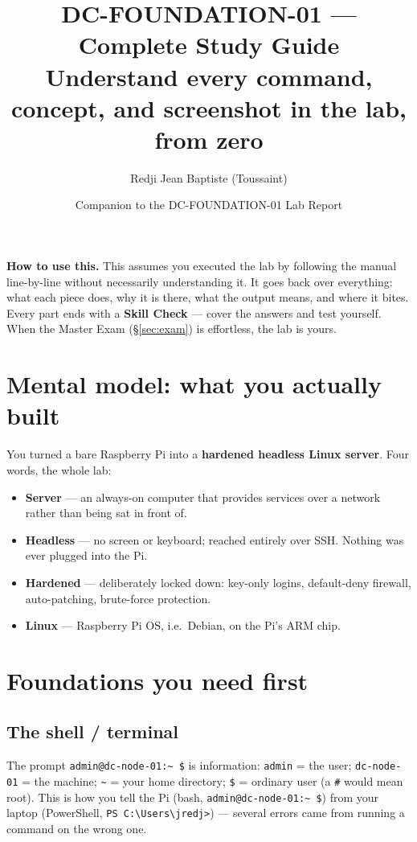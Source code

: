 \documentclass[11pt,a4paper]{article}
\title{\vspace{-1cm}\textbf{\color{dcred}DC-FOUNDATION-01 — Complete Study Guide}\\[4pt]
\large Understand every command, concept, and screenshot in the lab, from zero}
\author{Redji Jean Baptiste (Toussaint)}
\date{Companion to the DC-FOUNDATION-01 Lab Report}
\begin{document}
\maketitle
\thispagestyle{fancy}

\begin{tcolorbox}[colback=codebg,colframe=dcgray!50,boxrule=0.5pt]
\textbf{How to use this.} This assumes you executed the lab by following the
manual line-by-line without necessarily understanding it. It goes back over
everything: what each piece does, why it is there, what the output means, and
where it bites. Every part ends with a \textbf{Skill Check} — cover the answers
and test yourself. When the Master Exam (§\ref{sec:exam}) is effortless, the lab
is yours.
\end{tcolorbox}

\tableofcontents
\clearpage

\section{Mental model: what you actually built}
You turned a bare Raspberry Pi into a \textbf{hardened headless Linux server}.
Four words, the whole lab:
\begin{itemize}[leftmargin=1.4em]
\item \textbf{Server} — an always-on computer that provides services over a network rather than being sat in front of.
\item \textbf{Headless} — no screen or keyboard; reached entirely over SSH. Nothing was ever plugged into the Pi.
\item \textbf{Hardened} — deliberately locked down: key-only logins, default-deny firewall, auto-patching, brute-force protection.
\item \textbf{Linux} — Raspberry Pi OS, i.e.\ Debian, on the Pi's ARM chip.
\end{itemize}

\section{Foundations you need first}
\subsection{The shell / terminal}
The prompt \texttt{admin@dc-node-01:\~{} \$} is information: \texttt{admin} = the
user; \texttt{dc-node-01} = the machine; \texttt{\~{}} = your home directory;
\texttt{\$} = ordinary user (a \texttt{\#} would mean root). This is how you tell
the Pi (bash, \texttt{admin@dc-node-01:\~{} \$}) from your laptop (PowerShell,
\texttt{PS C:\textbackslash Users\textbackslash jredj>}) — several errors came
from running a command on the wrong one.
\end{document}

